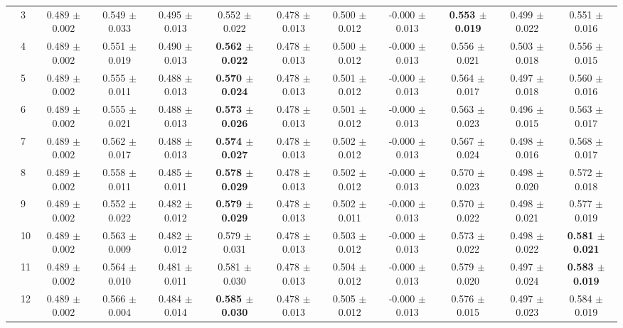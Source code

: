 \begin{table*}[t]
{\begin{tabular}{%
  ll
  @{\quad}
  c@{\hskip 4pt}c
  @{\quad\quad}
  c@{\hskip 4pt}c
  @{\quad\quad}
  c@{\hskip 4pt}c
  @{\quad\quad}
  c@{\hskip 4pt}c
  @{\quad\quad}
  c@{\hskip 4pt}c
}
        & 3 & 0.489 $\pm$ 0.002 & 0.549 $\pm$ 0.033 & 0.495 $\pm$ 0.013 & 0.552 $\pm$ 0.022 & 0.478 $\pm$ 0.013 & 0.500 $\pm$ 0.012 & -0.000 $\pm$ 0.013 & \textbf{0.553 $\pm$ 0.019} & 0.499 $\pm$ 0.022 & 0.551 $\pm$ 0.016 \\
        & 4 & 0.489 $\pm$ 0.002 & 0.551 $\pm$ 0.019 & 0.490 $\pm$ 0.013 & \textbf{0.562 $\pm$ 0.022} & 0.478 $\pm$ 0.013 & 0.500 $\pm$ 0.012 & -0.000 $\pm$ 0.013 & 0.556 $\pm$ 0.021 & 0.503 $\pm$ 0.018 & 0.556 $\pm$ 0.015 \\
        & 5 & 0.489 $\pm$ 0.002 & 0.555 $\pm$ 0.011 & 0.488 $\pm$ 0.013 & \textbf{0.570 $\pm$ 0.024} & 0.478 $\pm$ 0.013 & 0.501 $\pm$ 0.012 & -0.000 $\pm$ 0.013 & 0.564 $\pm$ 0.017 & 0.497 $\pm$ 0.018 & 0.560 $\pm$ 0.016 \\
        & 6 & 0.489 $\pm$ 0.002 & 0.555 $\pm$ 0.021 & 0.488 $\pm$ 0.013 & \textbf{0.573 $\pm$ 0.026} & 0.478 $\pm$ 0.013 & 0.501 $\pm$ 0.012 & -0.000 $\pm$ 0.013 & 0.563 $\pm$ 0.023 & 0.496 $\pm$ 0.015 & 0.563 $\pm$ 0.017 \\
        & 7 & 0.489 $\pm$ 0.002 & 0.562 $\pm$ 0.017 & 0.488 $\pm$ 0.013 & \textbf{0.574 $\pm$ 0.027} & 0.478 $\pm$ 0.013 & 0.502 $\pm$ 0.012 & -0.000 $\pm$ 0.013 & 0.567 $\pm$ 0.024 & 0.498 $\pm$ 0.016 & 0.568 $\pm$ 0.017 \\
        & 8 & 0.489 $\pm$ 0.002 & 0.558 $\pm$ 0.011 & 0.485 $\pm$ 0.011 & \textbf{0.578 $\pm$ 0.029} & 0.478 $\pm$ 0.013 & 0.502 $\pm$ 0.012 & -0.000 $\pm$ 0.013 & 0.570 $\pm$ 0.023 & 0.498 $\pm$ 0.020 & 0.572 $\pm$ 0.018 \\
        & 9 & 0.489 $\pm$ 0.002 & 0.552 $\pm$ 0.022 & 0.482 $\pm$ 0.012 & \textbf{0.579 $\pm$ 0.029} & 0.478 $\pm$ 0.013 & 0.502 $\pm$ 0.011 & -0.000 $\pm$ 0.013 & 0.570 $\pm$ 0.022 & 0.498 $\pm$ 0.021 & 0.577 $\pm$ 0.019 \\
        & 10 & 0.489 $\pm$ 0.002 & 0.563 $\pm$ 0.009 & 0.482 $\pm$ 0.012 & 0.579 $\pm$ 0.031 & 0.478 $\pm$ 0.013 & 0.503 $\pm$ 0.012 & -0.000 $\pm$ 0.013 & 0.573 $\pm$ 0.022 & 0.498 $\pm$ 0.022 & \textbf{0.581 $\pm$ 0.021} \\
        & 11 & 0.489 $\pm$ 0.002 & 0.564 $\pm$ 0.010 & 0.481 $\pm$ 0.011 & 0.581 $\pm$ 0.030 & 0.478 $\pm$ 0.013 & 0.504 $\pm$ 0.012 & -0.000 $\pm$ 0.013 & 0.579 $\pm$ 0.020 & 0.497 $\pm$ 0.024 & \textbf{0.583 $\pm$ 0.019} \\
        & 12 & 0.489 $\pm$ 0.002 & 0.566 $\pm$ 0.004 & 0.484 $\pm$ 0.014 & \textbf{0.585 $\pm$ 0.030} & 0.478 $\pm$ 0.013 & 0.505 $\pm$ 0.012 & -0.000 $\pm$ 0.013 & 0.576 $\pm$ 0.015 & 0.497 $\pm$ 0.023 & 0.584 $\pm$ 0.019 \\

\end{tabular}}
\end{table*}
